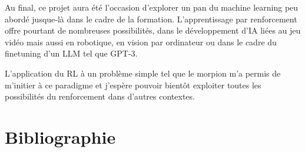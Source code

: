 \documentclass[french]{article}
\begin{document}
    Au final, ce projet aura été l'occasion d'explorer un pan du machine learning peu abordé jusque-là dans le cadre de la formation. L'apprentissage par renforcement offre pourtant de nombreuses possibilités, dans le développement d'IA liées au jeu vidéo mais aussi en robotique, en vision par ordinateur ou dans le cadre du finetuning d'un LLM tel que GPT-3. 

    L'application du RL à un problème simple tel que le morpion m'a permis de m'initier à ce paradigme et j'espère pouvoir bientôt exploiter toutes les possibilités du renforcement dans d'autres contextes.

    \section*{Bibliographie}
\end{document}

